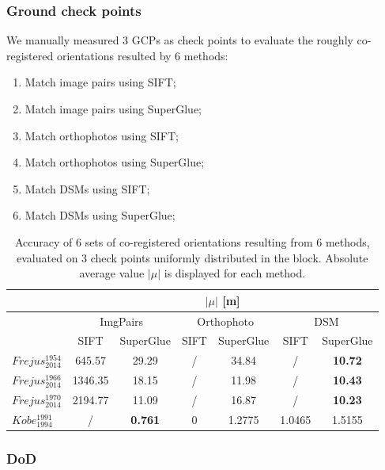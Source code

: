 \subsubsection{Ground check points}
We manually measured 3 GCPs as check points to evaluate the roughly co-registered orientations resulted by 6 methods:\\
\begin{enumerate}
	\item Match image pairs using SIFT;
	\item Match image pairs using SuperGlue;
	\item Match orthophotos using SIFT;
	\item Match orthophotos using SuperGlue;
	\item Match DSMs using SIFT;
	\item Match DSMs using SuperGlue;
\end{enumerate}

\begin{table}%
	\footnotesize
	\centering
	\begin{tabular}{|l|c|c|c|c|c|c|}\hline
		&\multicolumn{6}{c|}{$|\mu|$ [m]}\\\hline
		&\multicolumn{2}{c|}{ImgPairs} &\multicolumn{2}{c|}{Orthophoto} &\multicolumn{2}{c|}{DSM}\\\hline
		& SIFT & SuperGlue & SIFT & SuperGlue & SIFT & SuperGlue \\\hline\hline
		$Frejus_{2014}^{1954}$ & 645.57 & 29.29 & / & 34.84 & / & \textbf{10.72}\\\hline
		$Frejus_{2014}^{1966}$ & 1346.35 & 18.15 & / & 11.98 & / & \textbf{10.43}\\\hline
		$Frejus_{2014}^{1970}$ & 2194.77 & 11.09 & / & 16.87 & / & \textbf{10.23}\\\hline\hline
		$Kobe_{1994}^{1991}$ & / & \textbf{0.761} & 0 & 1.2775 & 1.0465 & 1.5155\\\hline
\end{tabular}
	\caption{Accuracy of 6 sets of co-registered orientations resulting from 6 methods, evaluated on 3 check points uniformly distributed in the block. Absolute average value $|\mu|$ is displayed for each method.}
	\label{CheckptAcuracy}
\end{table}

\subsubsection{DoD}


